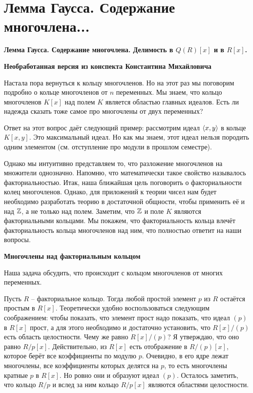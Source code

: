 \section{
 Лемма Гаусса. Содержание многочлена... %
}

\textbf{Лемма Гаусса. Содержание многочлена. Делимость в $Q(R)[x]$ и в $R[x]$.}

\textbf{Необработанная версия из конспекта Константина Михайловича}


Настала пора вернуться к кольцу многочленов. Но на этот раз мы поговорим подробно о кольце многочленов от $n$ переменных. Мы знаем, что кольцо многочленов $K[x]$ над полем $K$ является областью главных идеалов. Есть ли надежда сказать тоже самое про многочлены от двух переменных? 

Ответ на этот вопрос даёт следующий пример: рассмотрим идеал $\left\langle x,y \right\rangle$ в кольце $K[x,y]$. Это максимальный идеал. Но как мы знаем, этот идеал нельзя породить одним элементом (см. отступление про модули в прошлом семестре). 

Однако мы интуитивно представляем то, что разложение многочленов на множители однозначно. Напомню, что математически такое свойство называлось факториальностью. Итак, наша ближайшая цель поговорить о факториальности колец многочленов. Однако, для приложений к теории чисел нам будет необходимо разработать теорию в достаточной общности, чтобы применить её и над $\mathbb{Z}$, а не только над полем. Заметим, что $\mathbb{Z}$ и поле $K$ являются факториальными кольцами. Мы покажем, что факториальность кольца влечёт факториальность кольца многочленов над ним, что полностью ответит на наши вопросы.



\textbf{Многочлены над факториальным кольцом}

Наша задача обсудить, что происходит с кольцом многочленов от многих переменных.


\lm[Гаусс] Пусть $R$ -- факториальное кольцо. Тогда любой простой элемент $p$ из $R$ остаётся простым в $R[x]$.
\proof
Теоретически удобно воспользоваться следующим соображением: чтобы показать, что элемент прост надо показать, что идеал $(p)$ в $R[x]$ прост, а для этого необходимо и достаточно установить, что $R[x]/(p)$ есть область целостности. Чему же равно $R[x]/(p)$? Я утверждаю, что оно равно $R/p[x]$. Действительно, из $R[x]$ есть отображение в $R/(p)[x]$, которое берёт все коэффициенты по модулю $p$. Очевидно, в его ядре лежат многочлены, все коэффициенты которых делятся на $p$, то есть многочлены кратные $p$ в $R[x]$. Но ровно они и образуют идеал $(p)$. Осталось заметить, что кольцо $R/p$ и вслед за ним кольцо $R/p[x]$ являются областями целостности.

